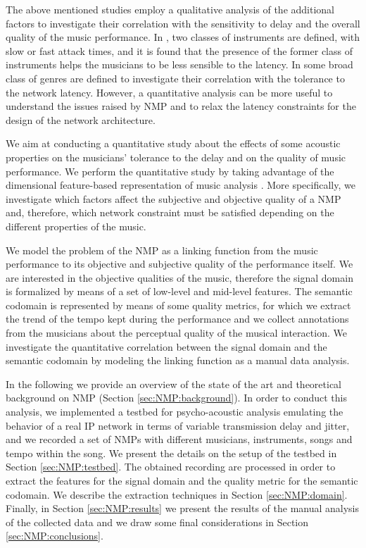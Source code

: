 The above mentioned studies employ a qualitative analysis of the additional factors to investigate their correlation with the sensitivity to delay and the overall quality of the music performance. In \cite{barbosa2011influence}, two classes of instruments are defined, with slow or fast attack times, and it is found that the presence of the former class of instruments helps the musicians to be less sensible to the latency. In \cite{Chew2004} some broad class of genres are defined to investigate their correlation with the tolerance to the network latency. However, a quantitative analysis can be more useful to understand the issues raised by NMP and to relax the latency constraints for the design of the network architecture.

We aim at conducting a quantitative study about the effects of some acoustic properties on the musicians' tolerance to the delay and on the quality of music performance. We perform the quantitative study by taking advantage of the dimensional feature-based representation of music analysis \cite{Kim2005,Zanoni2012}. More specifically, we investigate which factors affect the subjective and objective quality of a NMP and, therefore, which network constraint must be satisfied depending on the different properties of the music.

We model the problem of the NMP as a linking function from the music performance to its objective and subjective quality of the performance itself. We are interested in the objective qualities of the music, therefore the signal domain is formalized by means of a set of low-level and mid-level features. The semantic codomain is represented by means of some quality metrics, for which we extract the trend of the tempo kept during the performance and we collect annotations from the musicians about the perceptual quality of the musical interaction. We investigate the quantitative correlation between the signal domain and the semantic codomain by modeling the linking function as a manual data analysis.

In the following we provide an overview of the state of the art and theoretical background on NMP (Section \ref{sec:NMP:background}). In order to conduct this analysis, we implemented a testbed for psycho-acoustic analysis emulating the behavior of a real IP network in terms of variable transmission delay and jitter, and we recorded a set of NMPs with different musicians, instruments, songs and tempo within the song. We present the details on the setup of the testbed in Section \ref{sec:NMP:testbed}. The obtained recording are processed in order to extract the features for the signal domain and the quality metric for the semantic codomain. We describe the extraction techniques in Section 
\ref{sec:NMP:domain}. Finally, in Section \ref{sec:NMP:results} we present the results of the manual analysis of the collected data and we draw some final considerations in Section \ref{sec:NMP:conclusions}.

